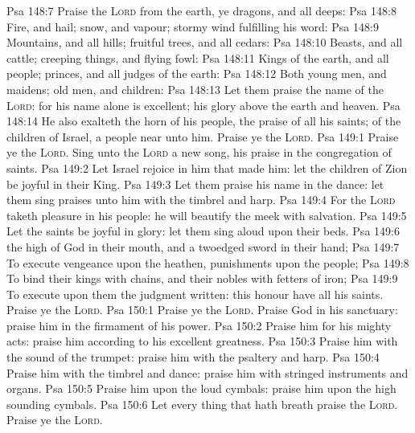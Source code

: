 \vs Psa 148:7 Praise the \textsc{Lord} from the earth, ye dragons, and all deeps:
\vs Psa 148:8 Fire, and hail; snow, and vapour; stormy wind fulfilling his word:
\vs Psa 148:9 Mountains, and all hills; fruitful trees, and all cedars:
\vs Psa 148:10 Beasts, and all cattle; creeping things, and flying fowl:
\vs Psa 148:11 Kings of the earth, and all people; princes, and all judges of the earth:
\vs Psa 148:12 Both young men, and maidens; old men, and children:
\vs Psa 148:13 Let them praise the name of the \textsc{Lord}: for his name alone is excellent; his glory  above the earth and heaven.
\vs Psa 148:14 He also exalteth the horn of his people, the praise of all his saints;  of the children of Israel, a people near unto him. Praise ye the \textsc{Lord}.
\vs Psa 149:1 Praise ye the \textsc{Lord}. Sing unto the \textsc{Lord} a new song,  his praise in the congregation of saints.
\vs Psa 149:2 Let Israel rejoice in him that made him: let the children of Zion be joyful in their King.
\vs Psa 149:3 Let them praise his name in the dance: let them sing praises unto him with the timbrel and harp.
\vs Psa 149:4 For the \textsc{Lord} taketh pleasure in his people: he will beautify the meek with salvation.
\vs Psa 149:5 Let the saints be joyful in glory: let them sing aloud upon their beds.
\vs Psa 149:6  the high  of God  in their mouth, and a twoedged sword in their hand;
\vs Psa 149:7 To execute vengeance upon the heathen,  punishments upon the people;
\vs Psa 149:8 To bind their kings with chains, and their nobles with fetters of iron;
\vs Psa 149:9 To execute upon them the judgment written: this honour have all his saints. Praise ye the \textsc{Lord}.
\vs Psa 150:1 Praise ye the \textsc{Lord}. Praise God in his sanctuary: praise him in the firmament of his power.
\vs Psa 150:2 Praise him for his mighty acts: praise him according to his excellent greatness.
\vs Psa 150:3 Praise him with the sound of the trumpet: praise him with the psaltery and harp.
\vs Psa 150:4 Praise him with the timbrel and dance: praise him with stringed instruments and organs.
\vs Psa 150:5 Praise him upon the loud cymbals: praise him upon the high sounding cymbals.
\vs Psa 150:6 Let every thing that hath breath praise the \textsc{Lord}. Praise ye the \textsc{Lord}.
